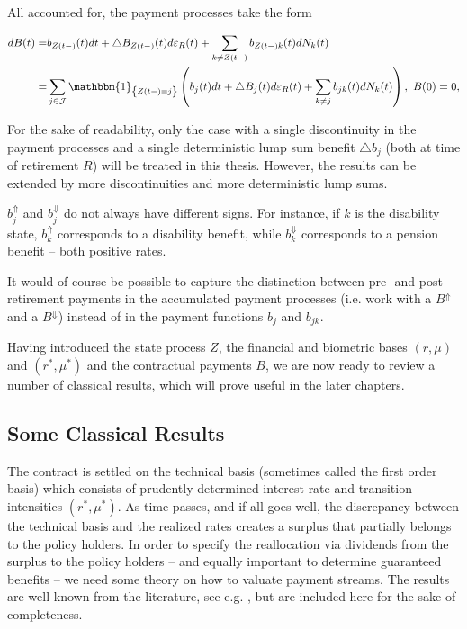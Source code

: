 \documentclass{article}
\newcommand{\1}[1]{\mathbbm{1}_{\left\lbrace #1 \right\rbrace}}
\theoremstyle{break}
\theoremstyle{remark}
\newenvironment{remark}
  {\pushQED{\qed}\renewcommand{\qedsymbol}{\scalebox{1.4}{$\circ$}}\remarkx}
  {\popQED\endremarkx}
\numberwithin{equation}{section}
\begin{document}
All accounted for, the payment processes take the form

\begin{align} \label{PaymentProcessDef}
\begin{split}
	    dB(t) =& b_{Z(t-)}(t)dt + \triangle B_{Z(t-)}(t) d \varepsilon_{R}(t) + \sum_{k \neq Z(t-)}b_{{Z(t-)}k}(t)dN_{k}(t) \\
    =& \sum_{j \in \mathcal{J}} \1{Z(t-)=j} \left( b_j(t)dt + \triangle B_j(t) d \varepsilon_{R}(t) + \sum_{k \neq j}b_{jk}(t)dN_{k}(t) \right), \, \, B(0) = 0,
\end{split}
\end{align}

\begin{remark}
	For the sake of readability, only the case with a single discontinuity in the payment processes and a single deterministic lump sum benefit $\triangle b_j$ (both at time of retirement $R$) will be treated in this thesis. However, the results can be extended by more discontinuities and more deterministic lump sums.
\end{remark}

\begin{remark}
	$b_j^{\Uparrow}$ and $b_j^{\Downarrow}$ do not always have different signs. For instance, if $k$ is the disability state, $b_k^{\Uparrow}$ corresponds to a disability benefit, while $b_k^{\Downarrow}$ corresponds to a pension benefit -- both positive rates.
\end{remark}

\begin{remark}
	It would of course be possible to capture the distinction between pre- and post-retirement payments in the accumulated payment processes (i.e. work with a $B^{\Uparrow}$ and a $B^{\Downarrow}$) instead of in the payment functions $b_j$ and $b_{jk}$.
\end{remark}

Having introduced the state process $Z$, the financial and biometric bases $(r,\mu)$ and $(r^*,\mu^*)$ and the contractual payments $B$, we are now ready to review a number of classical results, which will prove useful in the later chapters.

\subsection{Some Classical Results}

The contract is settled on the technical basis (sometimes called the first order basis) which consists of prudently determined interest rate and transition intensities $(r^*,\mu^*)$. As time passes, and if all goes well, the discrepancy between the technical basis and the realized rates creates a surplus that partially belongs to the policy holders. In order to specify the reallocation via dividends from the surplus to the policy holders -- and equally important to determine guaranteed benefits -- we need some theory on how to valuate payment streams. The results are well-known from the literature, see e.g. \cite{Norberg1991}, but are included here for the sake of completeness.
\end{document}
